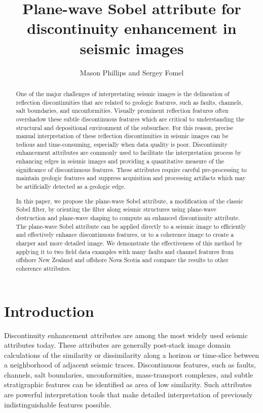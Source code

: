 \title{Plane-wave Sobel attribute for discontinuity enhancement in seismic images}
\author{Mason Phillips and Sergey Fomel}
\address{The University of Texas at Austin}


\maketitle
\begin{abstract}
One of the major challenges of interpretating seismic images is the delineation of reflection discontinuities that are related to geologic features, such as faults, channels, salt boundaries, and unconformities. 
Visually prominent reflection features often overshadow these subtle discontinuous features which are critical to understanding the structural and depositional environment of the subsurface. 
For this reason, precise manual interpretation of these reflection discontinuities in seismic images can be tedious and time-consuming, especially when data quality is poor. 
Discontinuity enhancement attributes are commonly used to facilitate the interpretation process by enhancing edges in seismic images and providing a quantitative measure of the significance of discontinuous features. 
These attributes require careful pre-processing to maintain geologic features and suppress acquisition and processing artifacts which may be artificially detected as a geologic edge. 

In this paper, we propose the plane-wave Sobel attribute, a modification of the classic Sobel filter, by orienting the filter along seismic structures using plane-wave destruction and plane-wave shaping to compute an enhanced discontinuity attribute. 
The plane-wave Sobel attribute can be applied directly to a seismic image to efficiently and effectively enhance discontinuous features, or to a coherence image to create a sharper and more detailed image. 
We demonstrate the effectiveness of this method by applying it to two field data examples with many faults and channel features from offshore New Zealand and offshore Nova Scotia and compare the results to other coherence attributes.
\end{abstract}

\section{Introduction}
Discontinuity enhancement attributes are among the most widely used seismic attributes today. 
These attributes are generally post-stack image domain calculations of the similarity or dissimilarity along a horizon or time-slice between a neighborhood of adjacent seismic traces. 
Discontinuous features, such as faults, channels, salt boundaries, unconformities, mass-transport complexes, and subtle stratigraphic features can be identified as area of low similarity. 
Such attributes are powerful interpretation tools that make detailed interpretation of previously indistinguishable features possible.

